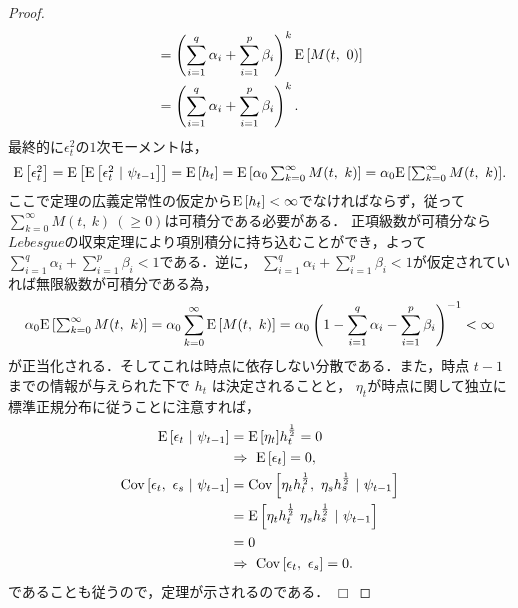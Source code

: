 \documentclass[8pt]{jsarticle}
\newtheorem{proof}{証明}
\def\qed{\hfill $\Box$}
\def\Exp#1{\mbox{${\rm E} \left[ #1 \right]$}}
\def\Cov#1#2{\mbox{${\rm Cov} \left[ #1,\ #2 \right]$}}
\begin{document}
\begin{proof}
\begin{align*}
	&= \left( \sum_{i=1}^{q} \alpha_i + \sum_{i=1}^{p} \beta_i \right)^k \Exp{M(t,\ 0)} \\
	&= \left( \sum_{i=1}^{q} \alpha_i + \sum_{i=1}^{p} \beta_i \right)^k.
\end{align*}
最終的に$\epsilon_t^2$の$1$次モーメントは，
\begin{align*}
	\Exp{\epsilon_t^2} = \Exp{\Exp{\epsilon_t^2\ |\ \psi_{t-1}}} = \Exp{h_t}
	= \Exp{ \alpha_0 \sum_{k=0}^{\infty} M(t,\ k) }
	= \alpha_0 \Exp{ \sum_{k=0}^{\infty} M(t,\ k) }.
\end{align*}
ここで定理の広義定常性の仮定から$\Exp{h_t} < \infty$でなければならず，従って$\sum_{k=0}^{\infty} M(t,\ k)\ (\geq 0)$は可積分である必要がある．
正項級数が可積分なら$Lebesgue$の収束定理により項別積分に持ち込むことができ，よって$\sum_{i=1}^{q} \alpha_i + \sum_{i=1}^{p} \beta_i < 1$である．逆に，
$\sum_{i=1}^{q} \alpha_i + \sum_{i=1}^{p} \beta_i < 1$が仮定されていれば無限級数が可積分である為，
\[
	\alpha_0 \Exp{ \sum_{k=0}^{\infty} M(t,\ k) } = \alpha_0 \sum_{k=0}^{\infty} \Exp{ M(t,\ k) } = \alpha_0 \left( 1 - \sum_{i=1}^{q} \alpha_i - \sum_{i=1}^{p} \beta_i \right)^{-1} < \infty
\]
が正当化される．そしてこれは時点に依存しない分散である．また，時点 $t-1$ までの情報が与えられた下で $h_t$ は決定されることと，
$\eta_t$が時点に関して独立に標準正規分布に従うことに注意すれば，
\begin{align*}
	\Exp{\epsilon_t\ |\ \psi_{t-1}} &= \Exp{\eta_t}h_t^\frac{1}{2} = 0\ \\
	&\Rightarrow\ \Exp{\epsilon_t} = 0, \\
	\Cov{\epsilon_t}{\epsilon_s\ |\ \psi_{t-1}} &= \Cov{\eta_t h_t^\frac{1}{2}}{\eta_s h_s^\frac{1}{2}\ |\ \psi_{t-1}} \\
	&= \Exp{\eta_t h_t^\frac{1}{2}\ \eta_s h_s^\frac{1}{2}\ |\ \psi_{t-1}} \\
	&= 0 \\
	&\Rightarrow\ \Cov{\epsilon_t}{\epsilon_s} = 0.
\end{align*}
であることも従うので，定理が示されるのである．
\qed
\end{proof}
\end{document}
